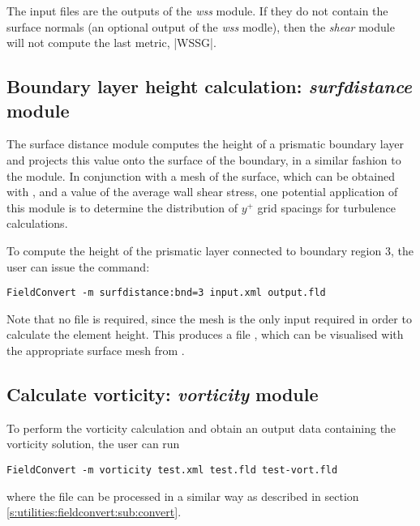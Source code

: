 The input  files are the outputs of the \textit{wss} module. If they do not contain the surface normals (an optional output of the \textit{wss} modle), then the \textit{shear} module will not compute the last metric, |WSSG|.


%
%
%
\subsection{Boundary layer height calculation: \textit{surfdistance} module}

The surface distance module computes the height of a prismatic boundary layer
and projects this value onto the surface of the boundary, in a similar fashion
to the  module. In conjunction with a mesh of the surface, which
can be obtained with , and a value of the average wall shear
stress, one potential application of this module is to determine the
distribution of $y^+$ grid spacings for turbulence calculations.

To compute the height of the prismatic layer connected to boundary region 3, the
user can issue the command:
\begin{lstlisting}[style=BashInputStyle]
FieldConvert -m surfdistance:bnd=3 input.xml output.fld
\end{lstlisting}
Note that no  file is required, since the mesh is the only input
required in order to calculate the element height. This produces a file
, which can be visualised with the appropriate surface
mesh from .

%
%
%
\subsection{Calculate vorticity: \textit{vorticity} module}
To perform the vorticity calculation and obtain an output
data containing the vorticity solution, the user can run
\begin{lstlisting}[style=BashInputStyle]
FieldConvert -m vorticity test.xml test.fld test-vort.fld
\end{lstlisting}
where the file  can be processed in a similar
way as described in section \ref{s:utilities:fieldconvert:sub:convert}.
%
%
%

